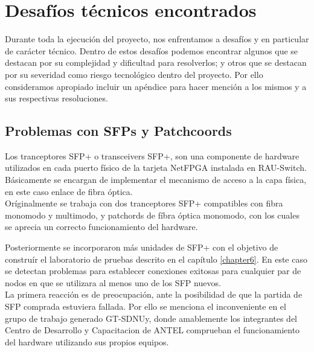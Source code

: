 
\chapter{Desaf\'ios t\'ecnicos encontrados}

\ifpdf
    \graphicspath{{Appendix2/Figs/Raster/}{Appendix2/Figs/PDF/}{Appendix2/Figs/}}
\else
    \graphicspath{{Appendix2/Figs/Vector/}{Appendix2/Figs/}}
\fi

Durante toda la ejecuci\'on del proyecto, nos enfrentamos a desaf\'ios y en particular de carácter t\'ecnico. Dentro de estos desaf\'ios podemos encontrar algunos que se destacan por su complejidad y dificultad para resolverlos; y otros que se destacan por su severidad como riesgo tecnol\'ogico dentro del proyecto. Por ello consideramos apropiado incluir un ap\'endice para hacer menci\'on a los mismos y a sus respectivas resoluciones.

\section{Problemas con SFPs y Patchcoords}

Los tranceptores SFP+ o transceivers SFP+, son una componente de hardware utilizados en cada puerto f\'isico de la tarjeta NetFPGA instalada en RAU-Switch. Básicamente se encargan de implementar el mecanismo de acceso a la capa f\'isica, en este caso enlace de fibra \'optica.\\ 
 
Or\'iginalmente se trabaja con dos tranceptores SFP+ compatibles con fibra monomodo y multimodo, y patchords de f\'ibra \'optica monomodo, con los cuales se aprecia un correcto funcionamiento del hardware. 

Posteriormente se incorporaron m\'as unidades de SFP+ con el objetivo de constru\'ir el laboratorio de pruebas descrito en el cap\'itulo \ref{chapter6}. En este caso se detectan problemas para establecer conexiones exitosas para cualquier par de nodos en que se utilizara al menos uno de los SFP nuevos.\\

La primera reacci\'on es de preocupación, ante la posibilidad de que la partida de SFP comprada estuviera fallada. Por ello se menciona el inconveniente en el grupo de trabajo generado GT-SDNUy, donde amablemente los integrantes del Centro de Desarrollo y Capacitacion de ANTEL comprueban el funcionamiento del hardware utilizando sus propios equipos.

